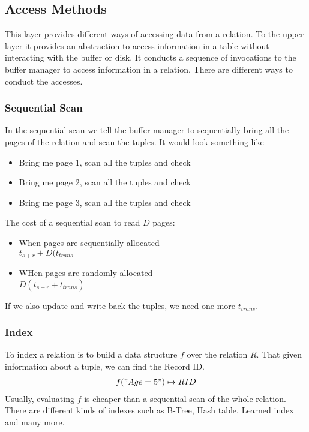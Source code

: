 \subsection{Access Methods}
This layer provides different ways of accessing data from a relation. To the upper layer it provides an abstraction to access information in a table without interacting with the buffer or disk. It conducts a sequence of invocations to the buffer manager to access information in a relation. There are different ways to conduct the accesses.

\subsubsection{Sequential Scan}
In the sequential scan we tell the buffer manager to sequentially bring all the pages of the relation and scan the tuples. It would look something like
\begin{itemize}
\item Bring me page 1, scan all the tuples and check
\item Bring me page 2, scan all the tuples and check
\item Bring me page 3, scan all the tuples and check
\end{itemize}
The cost of a sequential scan to read $D$ pages:
\begin{itemize}
\item When pages are sequentially allocated\\
$t_{s+r} + D(t_{trans}$
\item WHen pages are randomly allocated\\
$D(t_{s+r} + t_{trans})$
\end{itemize}
If we also update and write back the tuples, we need one more $t_{trans}$.

\subsubsection{Index}
To index a relation is to build a data structure $f$ over the relation $R$. That given information about a tuple, we can find the Record ID.
\begin{align*}
f("Age = 5") \mapsto RID
\end{align*}
Usually, evaluating $f$ is cheaper than a sequential scan of the whole relation. There are different kinds of indexes such as B-Tree, Hash table, Learned index and many more.

